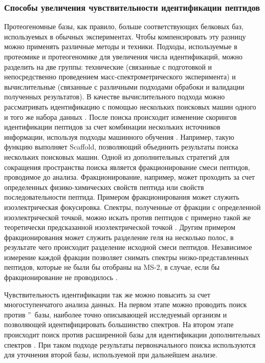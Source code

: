 \subsubsection{Способы увеличения чувствительности идентификации пептидов}
Протеогеномные базы, как правило, больше соответствующих белковых баз, используемых в обычных экспериментах. Чтобы компенсировать эту разницу можно применять различные методы и техники. Подходы, используемые в протеомике и протеогеномике для увеличения числа идентификаций, можно разделить на две группы: технические (связанные с подготовкой и непосредственно проведением масс-спектрометрического эксперимента) и вычислительные (связанные с различными подходами обрабоки и валидации полученных результатов). В качестве вычислительного подхода можно рассматривать идентификацию с помощью нескольких поисковых машин одного и того же набора данных \cite{shteynberg2013combining}. После поиска происходит изменение скорингов идентификации пептидов за счет комбинации нескольких источников информации, используя подходы машинного обучения \cite{nesvizhskii2010survey}. Например, такую функцию выполняет Scaffold, позволяющий объединить результаты поиска нескольких поисковых машин. Одной из дополнительных стратегий для сокращения пространства поиска является фракционирование смеси пептидов, проводимое до  анализа. Фракционирование, например, может проходить за счет определенных физико-химических свойств пептида или свойств последовательности пептида. Примером фракционирования может служить изоэлектрическая фокусировка. Спектры, полученные от фракции с определенной изоэлектрической точкой, можно искать против пептидов с примерно такой же теоретически предсказанной изоэлектрической точкой \cite{branca2014hirief}. Другим примером фракционирования может служить разделение геля на несколько полос, в результате чего происходит разделение исходной смеси пептидов. Независимое измерение каждой фракции позволяет снимать спектры низко-представленных пептидов, которые не были бы отобраны на MS-2, в случае, если бы фракционирование не проводилось \cite{bespyatykh2016proteome}.

Чувствительность идентификации так же можно повысить за счет многоступенчатого анализа данных. На первом этапе можно проводить поиск против \textquotedblright\ базы, наиболее точно описывающей исследуемый организм и позволяющей идентифицировать большинство спектров. На втором этапе происходит поиск против расширенной базы для идентификации дополнительных спектров \cite{ning2010computational, helmy2012mass}. При таком подходе результаты первоначального поиска используются для уточнения второй базы, используемой при дальнейшем анализе. 

